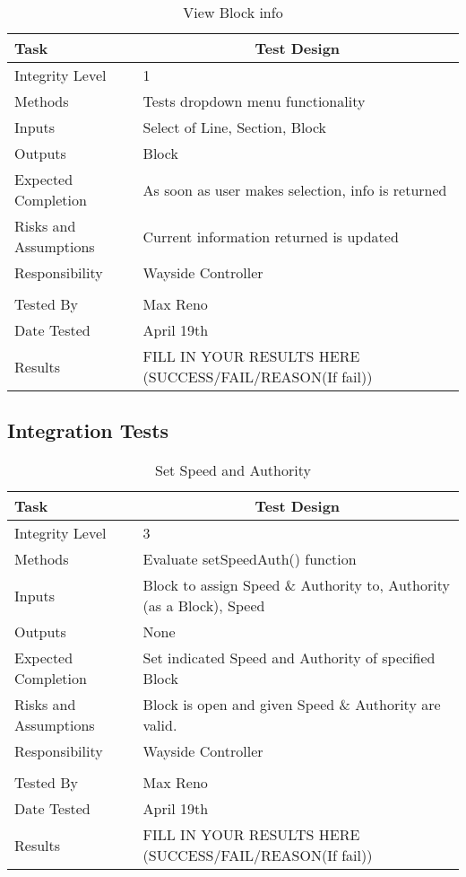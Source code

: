 \documentclass[]{article}
\begin{document}
\begin{table}[H]
	\centering
	\caption{View Block info}
	\begin{tabular}{|l|l|}
		\hline
		Task & \multicolumn{1}{c|}{Test Design} \\ \hline
		Integrity Level & 1 \\ \hline
		Methods & Tests dropdown menu functionality\\ \hline
		Inputs &  Select of Line, Section, Block \\ \hline
		Outputs &  Block\\ \hline
		Expected Completion & As soon as user makes selection, info is returned\\ \hline
		Risks and Assumptions & \parbox[t]{10cm}{Current information returned is updated} \\ \hline
		Responsibility & Wayside Controller\\ \hline
		\\ \hline
		Tested By   &  Max Reno\\	\hline
		Date Tested & \parbox[t]{10cm}{April 19th}\\ \hline
		Results & FILL IN YOUR RESULTS HERE (SUCCESS/FAIL/REASON(If fail))\\ \hline
	\end{tabular}
\end{table}

\subsection{Integration Tests}
	\begin{table}[H]
		\centering
		\caption{Set Speed and Authority}
		\begin{tabular}{|l|l|}
			\hline
			Task & \multicolumn{1}{c|}{Test Design} \\ \hline
			Integrity Level & 3 \\ \hline
			Methods & Evaluate setSpeedAuth() function\\ \hline
			Inputs &  \parbox[t]{10cm}{Block to assign Speed \& Authority to, Authority (as a Block), Speed} \\ \hline
			Outputs & None\\ \hline
			Expected Completion & Set indicated Speed and Authority of specified Block \\ \hline
			Risks and Assumptions & \parbox[t]{10cm}{Block is open and given Speed \& Authority are valid.} \\ \hline
			Responsibility & Wayside Controller\\ \hline
			\\ \hline
			Tested By   &  Max Reno\\	\hline
			Date Tested & \parbox[t]{10cm}{April 19th}\\ \hline
			Results & FILL IN YOUR RESULTS HERE (SUCCESS/FAIL/REASON(If fail))\\ \hline
		\end{tabular}
	\end{table}
	
\end{document}
